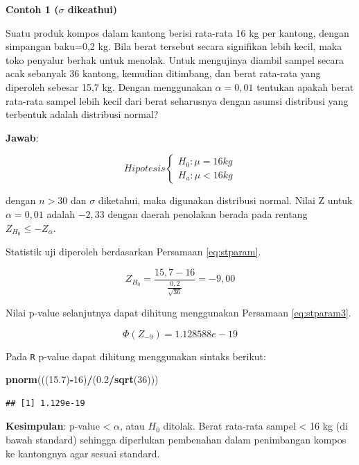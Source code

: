 \documentclass[]{book}
\newenvironment{Shaded}{\begin{snugshade}}{\end{snugshade}}
\newcommand{\KeywordTok}[1]{\textcolor[rgb]{0.13,0.29,0.53}{\textbf{#1}}}
\newcommand{\DecValTok}[1]{\textcolor[rgb]{0.00,0.00,0.81}{#1}}
\newcommand{\FloatTok}[1]{\textcolor[rgb]{0.00,0.00,0.81}{#1}}
\newcommand{\OperatorTok}[1]{\textcolor[rgb]{0.81,0.36,0.00}{\textbf{#1}}}
\newcommand{\NormalTok}[1]{#1}
\begin{document}
\textbf{Contoh 1 (\(\sigma\) dikeathui)}

Suatu produk kompos dalam kantong berisi rata-rata 16 kg per kantong,
dengan simpangan baku=0,2 kg. Bila berat tersebut secara signifikan
lebih kecil, maka toko penyalur berhak untuk menolak. Untuk mengujinya
diambil sampel secara acak sebanyak 36 kantong, kemudian ditimbang, dan
berat rata-rata yang diperoleh sebesar 15,7 kg. Dengan menggunakan
\(\alpha=0,01\) tentukan apakah berat rata-rata sampel lebih kecil dari
berat seharusnya dengan asumsi distribusi yang terbentuk adalah
distribusi normal?

\textbf{Jawab}:

\[
Hipotesis
  \begin{cases}
    H_0:\mu=16kg\\
    H_a:\mu<16kg
    \end{cases}
\]

dengan \(n>30\) dan \(\sigma\) diketahui, maka digunakan distribusi
normal. Nilai Z untuk \(\alpha=0,01\) adalah \(-2,33\) dengan daerah
penolakan berada pada rentang \(Z_{H_0}\le -Z_\alpha\).

Statistik uji diperoleh berdasarkan Persamaan \eqref{eq:stparam}.

\[
Z_{H_0}=\frac{15,7-16}{\frac{0,2}{\sqrt{36}}}=-9,00
\]

Nilai p-value selanjutnya dapat dihitung menggunakan Persamaan
\eqref{eq:stparam3}.

\[
\Phi\left(Z_{-9}\right)=1.128588e-19
\]

Pada \texttt{R} p-value dapat dihitung menggunakan sintaks berikut:

\begin{Shaded}
\begin{Highlighting}[]
\KeywordTok{pnorm}\NormalTok{(((}\FloatTok{15.7}\NormalTok{)}\OperatorTok{-}\DecValTok{16}\NormalTok{)}\OperatorTok{/}\NormalTok{(}\FloatTok{0.2}\OperatorTok{/}\KeywordTok{sqrt}\NormalTok{(}\DecValTok{36}\NormalTok{)))}
\end{Highlighting}
\end{Shaded}

\begin{verbatim}
## [1] 1.129e-19
\end{verbatim}

\textbf{Kesimpulan}: p-value \textless{} \(\alpha\), atau \(H_0\)
ditolak. Berat rata-rata sampel \textless{} 16 kg (di bawah standard)
sehingga diperlukan pembenahan dalam penimbangan kompos ke kantongnya
agar sesuai standard.
\end{document}
